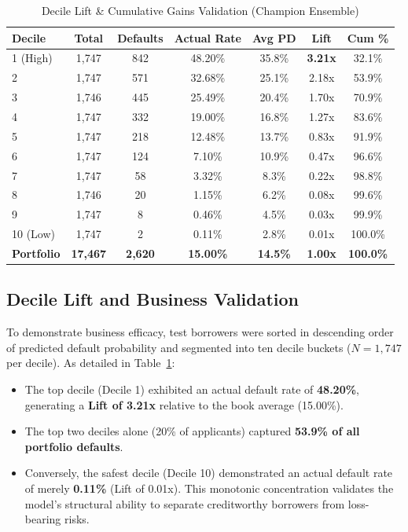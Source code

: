 \documentclass[conference]{IEEEtran}
\begin{document}
\begin{table}[htbp]
\caption{Decile Lift \& Cumulative Gains Validation (Champion Ensemble)}
\label{tab:decile}
\centering
\small
\begin{tabular}{lcccccc}
\toprule
\textbf{Decile} & \textbf{Total} & \textbf{Defaults} & \textbf{Actual Rate} & \textbf{Avg PD} & \textbf{Lift} & \textbf{Cum \%} \\
\midrule
1 (High) & 1,747 & 842 & 48.20\% & 35.8\% & \textbf{3.21x} & 32.1\% \\
2 & 1,747 & 571 & 32.68\% & 25.1\% & 2.18x & 53.9\% \\
3 & 1,746 & 445 & 25.49\% & 20.4\% & 1.70x & 70.9\% \\
4 & 1,747 & 332 & 19.00\% & 16.8\% & 1.27x & 83.6\% \\
5 & 1,747 & 218 & 12.48\% & 13.7\% & 0.83x & 91.9\% \\
6 & 1,747 & 124 & 7.10\% & 10.9\% & 0.47x & 96.6\% \\
7 & 1,747 & 58 & 3.32\% & 8.3\% & 0.22x & 98.8\% \\
8 & 1,746 & 20 & 1.15\% & 6.2\% & 0.08x & 99.6\% \\
9 & 1,747 & 8 & 0.46\% & 4.5\% & 0.03x & 99.9\% \\
10 (Low) & 1,747 & 2 & 0.11\% & 2.8\% & 0.01x & 100.0\% \\
\midrule
\textbf{Portfolio} & \textbf{17,467} & \textbf{2,620} & \textbf{15.00\%} & \textbf{14.5\%} & \textbf{1.00x} & \textbf{100.0\%} \\
\bottomrule
\end{tabular}
\end{table}

\subsection{Decile Lift and Business Validation}
To demonstrate business efficacy, test borrowers were sorted in descending order of predicted default probability and segmented into ten decile buckets ($N = 1,747$ per decile). As detailed in Table~\ref{tab:decile}:
\begin{itemize}
    \item The top decile (Decile 1) exhibited an actual default rate of \textbf{48.20\%}, generating a \textbf{Lift of 3.21x} relative to the book average (15.00\%).
    \item The top two deciles alone (20\% of applicants) captured \textbf{53.9\% of all portfolio defaults}.
    \item Conversely, the safest decile (Decile 10) demonstrated an actual default rate of merely \textbf{0.11\%} (Lift of 0.01x). This monotonic concentration validates the model's structural ability to separate creditworthy borrowers from loss-bearing risks.
\end{itemize}
\end{document}
